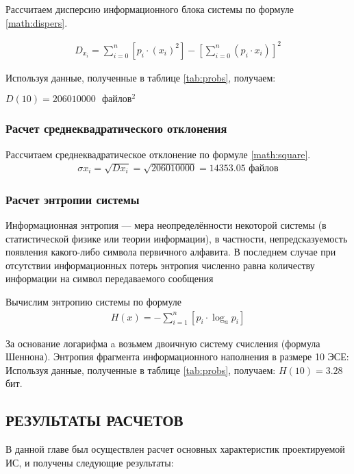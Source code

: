 \documentclass[a4paper,14pt]{extarticle}
\begin{document}
Рассчитаем дисперсию информационного блока системы по формуле \ref{math:dispers}.

\begin{align}
	D_{x_i}=\sum_{i=0}^{n}\left[p_i \cdot \left(x_i\right)^2 \right] - \left[\sum_{i=0}^{n} \left(p_i \cdot x_i\right) \right]^2
	\label{math:dispers}
\end{align}

Используя данные, полученные в таблице \ref{tab:probs}, получаем:

$D(10) = 206010000\mbox{ }файлов^2$

\subsubsection{Расчет среднеквадратического отклонения}

Рассчитаем среднеквадратическое отклонение по формуле \ref{math:square}.
\begin{align}
	\sigma x_i= \sqrt{Dx_i} = \sqrt{206010000} = 14353.05\mbox{ файлов}	
	\label{math:square}
\end{align}

\subsubsection{Расчет энтропии системы}

Информационная энтропия --- мера неопределённости некоторой системы (в статистической физике или теории информации), в частности, непредсказуемость появления какого-либо символа первичного алфавита. В последнем случае при отсутствии информационных потерь энтропия численно равна количеству информации на символ передаваемого сообщения

Вычислим энтропию системы по формуле 
\begin{align}
	H(x) = - \sum_{i=1}^{n}\left[p_i \cdot \log_ap_i\right]
\end{align}

За основание логарифма a возьмем двоичную систему счисления (формула Шеннона). Энтропия фрагмента информационного наполнения в размере 10 ЭСЕ:
Используя данные, полученные в таблице \ref{tab:probs}, получаем:
$H(10) = 3.28 $ бит.

\newpage
\subsection{РЕЗУЛЬТАТЫ РАСЧЕТОВ}

В данной главе был осуществлен расчет основных характеристик
проектируемой ИС, и получены следующие результаты:
\end{document}
